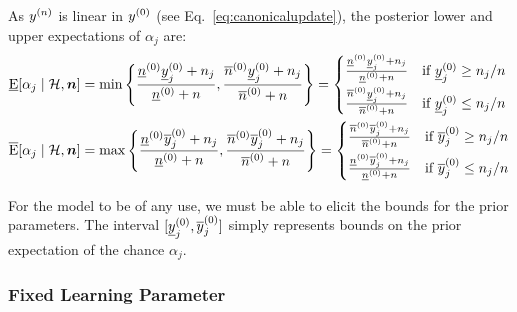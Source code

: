 As $y^{(n)}$ is linear in $y^{(0)}$ (see Eq.~\eqref{eq:canonicalupdate}), the posterior lower and upper expectations of $\alpha_j$ are:
\begin{align}
  \label{eq:idm-update-lower}
  \underline{\operatorname{E}}[\alpha_j\mid\mathcal{H},{\bm n}]
  &=
  \min\left\{
    \frac{\underline{n}^{(0)}\underline{y}^{(0)}_j + n_j}{\underline{n}^{(0)} + n},
    \frac{\overline{n}^{(0)}\underline{y}^{(0)}_j + n_j}{\overline{n}^{(0)} + n}
  \right\}
  =
  \begin{cases}
    \frac{\underline{n}^{(0)}\underline{y}^{(0)}_j + n_j}{\underline{n}^{(0)} + n} & \text{if }\underline{y}^{(0)}_j\ge n_j/n \\[1ex]
    \frac{\overline{n}^{(0)}\underline{y}^{(0)}_j + n_j}{\overline{n}^{(0)} + n} & \text{if }\underline{y}^{(0)}_j\le n_j/n
  \end{cases}
  \\
  \label{eq:idm-update-upper}
  \overline{\operatorname{E}}[\alpha_j\mid\mathcal{H},{\bm n}]
  &=
  \max\left\{
    \frac{\underline{n}^{(0)}\overline{y}^{(0)}_j + n_j}{\underline{n}^{(0)} + n},
    \frac{\overline{n}^{(0)}\overline{y}^{(0)}_j + n_j}{\overline{n}^{(0)} + n}
  \right\}
  =
  \begin{cases}
    \frac{\overline{n}^{(0)}\overline{y}^{(0)}_j + n_j}{\overline{n}^{(0)} + n} & \text{if }\overline{y}^{(0)}_j\ge n_j/n \\[1ex]
    \frac{\underline{n}^{(0)}\overline{y}^{(0)}_j + n_j}{\underline{n}^{(0)} + n} & \text{if }\overline{y}^{(0)}_j\le n_j/n
  \end{cases}
\end{align}

For the model to be of any use, we must be able to elicit the bounds for the prior parameters.
The interval $[\underline{y}^{(0)}_j,\overline{y}^{(0)}_j]$ simply represents bounds on the prior expectation of the chance $\alpha_j$.

\subsubsection{Fixed Learning Parameter}

